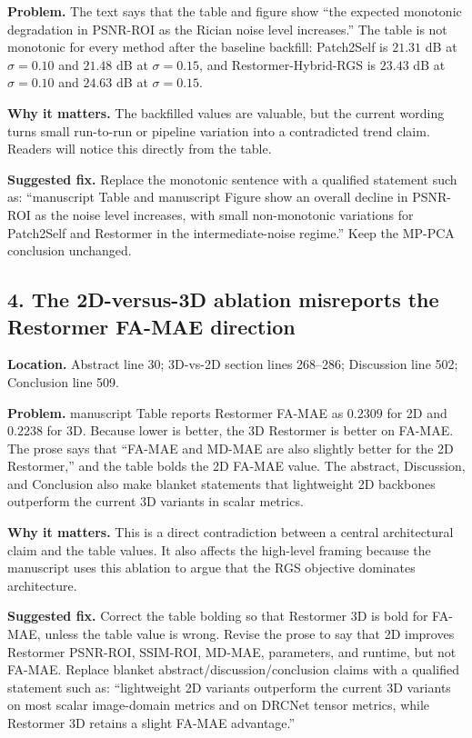 \documentclass[11pt]{article}
\newcommand{\code}[1]{\texttt{\detokenize{#1}}}
\begin{document}
\textbf{Problem.} The text says that the table and figure show ``the expected monotonic degradation in PSNR-ROI as the Rician noise level increases.'' The table is not monotonic for every method after the baseline backfill: Patch2Self is $21.31$ dB at $\sigma=0.10$ and $21.48$ dB at $\sigma=0.15$, and Restormer-Hybrid-RGS is $23.43$ dB at $\sigma=0.10$ and $24.63$ dB at $\sigma=0.15$.

\textbf{Why it matters.} The backfilled values are valuable, but the current wording turns small run-to-run or pipeline variation into a contradicted trend claim. Readers will notice this directly from the table.

\textbf{Suggested fix.} Replace the monotonic sentence with a qualified statement such as: ``manuscript Table \code{tab:sigma_sweep} and manuscript Figure \code{fig:sigma_robustness} show an overall decline in PSNR-ROI as the noise level increases, with small non-monotonic variations for Patch2Self and Restormer in the intermediate-noise regime.'' Keep the MP-PCA conclusion unchanged.

\subsection*{4. The 2D-versus-3D ablation misreports the Restormer FA-MAE direction}

\textbf{Location.} Abstract line 30; 3D-vs-2D section lines 268--286; Discussion line 502; Conclusion line 509.

\textbf{Problem.} manuscript Table \code{tab:3d_vs_2d} reports Restormer FA-MAE as $0.2309$ for 2D and $0.2238$ for 3D. Because lower is better, the 3D Restormer is better on FA-MAE. The prose says that ``FA-MAE and MD-MAE are also slightly better for the 2D Restormer,'' and the table bolds the 2D FA-MAE value. The abstract, Discussion, and Conclusion also make blanket statements that lightweight 2D backbones outperform the current 3D variants in scalar metrics.

\textbf{Why it matters.} This is a direct contradiction between a central architectural claim and the table values. It also affects the high-level framing because the manuscript uses this ablation to argue that the RGS objective dominates architecture.

\textbf{Suggested fix.} Correct the table bolding so that Restormer 3D is bold for FA-MAE, unless the table value is wrong. Revise the prose to say that 2D improves Restormer PSNR-ROI, SSIM-ROI, MD-MAE, parameters, and runtime, but not FA-MAE. Replace blanket abstract/discussion/conclusion claims with a qualified statement such as: ``lightweight 2D variants outperform the current 3D variants on most scalar image-domain metrics and on DRCNet tensor metrics, while Restormer 3D retains a slight FA-MAE advantage.''
\end{document}
